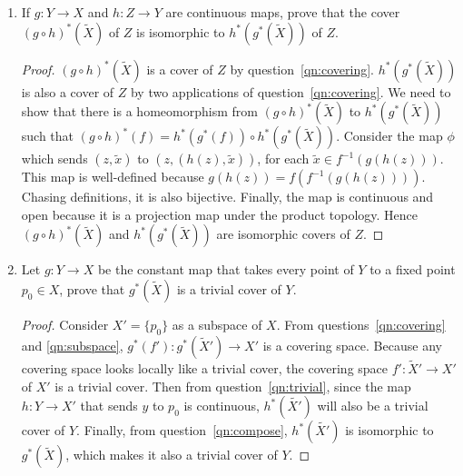 \documentclass{article}
\begin{document}
\begin{enumerate}
\begin{enumerate}
\begin{proof}
          $\phi$ is bijective from the way it was defined. Also, it is a
          projection map under the product topology, which makes it open
          and continuous. Therefore $\phi$ is a homeomorphism, which
          completes the proof.
        \end{proof}

      \item If $g:Y\rightarrow X$ and $h:Z\rightarrow Y$ are continuous
        maps, prove that the cover $(g\circ h)^*(\tilde{X})$ of $Z$ is
        isomorphic to $h^*(g^*(\tilde{X}))$ of $Z$. \label{qn:compose}

        \begin{proof}
          $(g\circ h)^*(\tilde{X})$ is a cover of $Z$ by
          question~\ref{qn:covering}. $h^*(g^*(\tilde{X}))$ is also a cover
          of $Z$ by two applications of question~\ref{qn:covering}.  We
          need to show that there is a homeomorphism from $(g\circ
          h)^*(\tilde{X})$ to $h^*(g^*(\tilde{X}))$ such that $(g\circ
          h)^*(f)=h^*(g^*(f))\circ h^*(g^*(\tilde{X}))$. Consider the map
          $\phi$ which sends $(z,\tilde{x})$ to $(z,(h(z),\tilde{x}))$,
          for each $\tilde{x}\in f^{-1}(g(h(z)))$. This map is well-defined
          because $g(h(z))=f(f^{-1}(g(h(z))))$. Chasing definitions, it is
          also bijective. Finally, the map is continuous and open because
          it is a projection map under the product topology. Hence $(g\circ
          h)^*(\tilde{X})$ and $h^*(g^*(\tilde{X}))$ are isomorphic covers
          of $Z$.
        \end{proof}

      \item Let $g:Y\rightarrow X$ be the constant map that takes every
        point of $Y$ to a fixed point $p_0\in X$, prove that
        $g^*(\tilde{X})$ is a trivial cover of $Y$. 

        \begin{proof}
          Consider $X'=\{p_0\}$ as a subspace of $X$.  From
          questions~\ref{qn:covering} and \ref{qn:subspace},
          $g^*(f'):g^*(\tilde{X}')\rightarrow X'$ is a covering space.
          Because any covering space looks locally like a trivial cover,
          the covering space $f':\tilde{X}'\rightarrow X'$ of $X'$ is a
          trivial cover. Then from question~\ref{qn:trivial}, since the map
          $h:Y\rightarrow X'$ that sends $y$ to $p_0$ is continuous,
          $h^*(\tilde{X'})$ will also be a trivial cover of $Y$. Finally,
          from question~\ref{qn:compose}, $h^*(\tilde{X'})$ is isomorphic
          to $g^*(\tilde{X})$, which makes it also a trivial cover of $Y$.
        \end{proof}
    \end{enumerate}


\end{enumerate}
\end{document}
